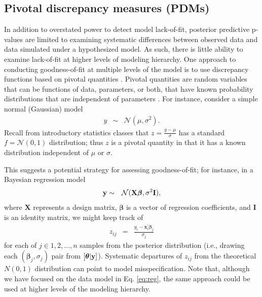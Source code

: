\documentclass[12pt,english]{article}
\begin{document}
\begin{spacing}{1.9}
\subsection{Pivotal discrepancy measures (PDMs)}

In addition to overstated power to detect model lack-of-fit, posterior predictive p-values are limited to examining systematic differences between observed data and data simulated under a hypothesized model.  As such, there is little ability to examine lack-of-fit at higher levels of modeling hierarchy.  One approach to conducting goodness-of-fit at multiple levels of the model is to use discrepancy functions based on pivotal quantities \citep{Johnson2004,YuanJohnson2012}.  Pivotal quantities are random variables that can be functions of data, parameters, or both, that have known probability distributions that are independent of parameters \citep[see e.g.,][section 9.2.2]{CasellaBerger1990}.  For instance, consider a simple normal (Gaussian) model
\begin{eqnarray*}
  y & \sim & \mathcal{N}(\mu,\sigma^2).
\end{eqnarray*}
Recall from introductory statistics classes that $z = \frac{y-\mu}{\sigma}$ has a standard $f=\mathcal{N}(0,1)$ distribution; thus $z$ is a pivotal quantity in that it has a known distribution independent of $\mu$ or $\sigma$.

This suggests a potential strategy for assessing goodness-of-fit; for instance, in a Bayesian regression model
\begin{eqnarray}
  \label{eq:reg}
  {\bf y} & \sim & \mathcal{N}(\textbf{X} \boldsymbol{\beta},\sigma^2 \textbf{I}),
\end{eqnarray}
where $\textbf{X}$ represents a design matrix, $\boldsymbol{\beta}$ is a vector of regression coefficients, and $\textbf{I}$ is an identity matrix, we might keep track of
\begin{eqnarray}
  \label{eq:resid}
  z_{ij} & = & \frac{y_i - \textbf{x}_i^\prime \boldsymbol{\beta}_j}{\sigma_j}
\end{eqnarray}
for each of $j \in {1, 2, \hdots, n}$ samples from the posterior distribution (i.e., drawing each $(\boldsymbol{\beta}_j, \sigma_j)$ pair from  $[\boldsymbol{\theta}|{\bf y}]$).  Systematic departures of $z_{ij}$ from the theoretical $N(0,1)$ distribution can point to model misspecification.  Note that, although we have focused on the data model in Eq. \ref{eq:reg}, the same approach could be used at higher levels of the modeling hierarchy.


\end{spacing}
\end{document}
